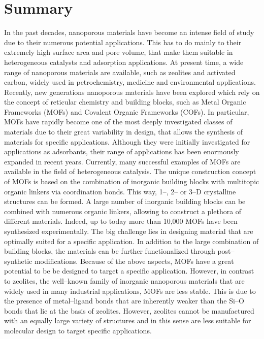 \chapter{Summary}
In the past decades, nanoporous materials have become an intense field of study due to their numerous potential applications. This has to do mainly to their extremely high surface area and pore volume, that make them suitable in heterogeneous catalysts and adsorption applications. At present time, a wide range of nanoporous materials are available, such as zeolites and activated carbon, widely used in petrochemistry, medicine and environmental applications. 
\npar
Recently, new generations nanoporous materials have been explored which rely on the concept of reticular chemistry and building blocks, such as Metal Organic Frameworks (MOFs) and Covalent Organic Frameworks (COFs). In particular, MOFs have rapidly become one of the most deeply investigated classes of materials due to their great variability in design, that allows the synthesis of materials for specific applications. Although they were initially investigated for applications as adsorbants, their range of applications has been enormously expanded in recent years. Currently, many successful examples of MOFs are available in the field of heterogeneous catalysis.
\npar
The unique construction concept of MOFs is based on the combination of inorganic building blocks with multitopic organic linkers via coordination bonds. This way, 1--, 2-- or 3--D crystalline structures can be formed. A large number of inorganic building blocks can be combined with numerous organic linkers, allowing to construct a plethora of different materials. Indeed, up to today more than 10,000 MOFs have been synthesized experimentally. The big challenge lies in designing material that are optimally suited for a specific application. In addition to the large combination of building blocks, the materials can be further functionalized through post--synthetic modifications. Because of the above aspects, MOFs have a great potential to be be designed to target a specific application. 
\npar
However, in contrast to zeolites, the well--known family of inorganic nanoporous materials that are widely used in many industrial applications, MOFs are less stable. This is due to the presence of metal--ligand bonds that are inherently weaker than the Si--O bonds that lie at the basis of zeolites. However, zeolites cannot be manufactured with an equally large variety of structures and in this sense are less suitable for molecular design to target specific applications.
\npar

